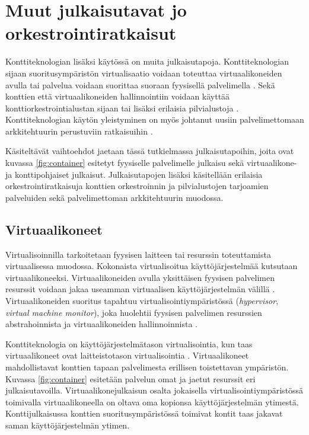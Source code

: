 \chapter{Muut julkaisutavat jo orkestrointiratkaisut\label{options}}

Konttiteknologian lisäksi käytössä on muita julkaisutapoja.
Konttiteknologian sijaan suoritusympäristön virtualisaatio voidaan toteuttaa virtuaalikoneiden avulla tai palvelua voidaan suorittaa suoraan fyysisellä palvelimella \cite{Watada19}.
Sekä konttien että virtuaalikoneiden hallinnointiin voidaan käyttää konttiorkestrointialustan sijaan tai lisäksi erilaisia pilvialustoja \cite{Bousselmi14}.
Konttiteknologian käytön yleistyminen on myös johtanut uusiin palvelimettomaan arkkitehtuurin perustuviin ratkaisuihin \cite{Baldini17}.

Käsiteltävät vaihtoehdot jaetaan tässä tutkielmassa julkaisutapoihin, joita ovat kuvassa \ref{fig:container} esitetyt fyysiselle palvelimelle julkaisu sekä virtuaalikone- ja konttipohjaiset julkaisut.
Julkaisutapojen lisäksi käsitellään erilaisia orkestrointiratkaisuja konttien orkestroinnin ja pilvialustojen tarjoamien palveluiden sekä palvelimettoman arkkitehtuurin muodossa.

\section{Virtuaalikoneet}

Virtualisoinnilla tarkoitetaan fyysisen laitteen tai resurssin toteuttamista virtuaalisessa muodossa.
Kokonaista virtualisoitua käyttöjärjestelmää kutsutaan virtuaalikoneeksi.
Virtuaalikoneiden avulla yksittäisen fyysisen palvelimen resurssit voidaan jakaa useamman virtuaalisen käyttöjärjestelmän välillä \cite{Smith05}.
Virtuaalikoneiden suoritus tapahtuu virtualisointiympäristössä (\textit{hypervisor}, \textit{virtual machine monitor}), joka huolehtii fyysisen palvelimen resurssien abstrahoinnista ja virtuaalikoneiden hallinnoinnista \cite{desai13}.

Konttiteknologia on käyttöjärjestelmätason virtualisointia, kun taas virtuaalikoneet ovat laitteistotason virtualisointia \cite{Compastie20}.
Virtuaalikoneet mahdollistavat konttien tapaan palvelimesta erillisen toistettavan ympäristön.
Kuvassa \ref{fig:container} esitetään palvelun omat ja jaetut resurssit eri julkaisutavoilla.
Virtuaalikonejulkaisun osalta jokaisella virtualisointiympäristössä toimivalla virtuaalikoneella on oltava oma kopionsa käyttöjärjestelmän ytimestä.
Konttijulkaisussa konttien suoritusympäristössä toimivat kontit taas jakavat saman käyttöjärjestelmän ytimen.

